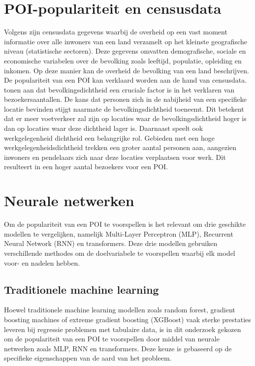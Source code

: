 \section{POI-populariteit en censusdata}

Volgens \textcite{Mrkic2020} zijn censusdata gegevens waarbij de overheid op een vast moment informatie over alle inwoners van een land verzamelt op het kleinste geografische niveau (statistische sectoren). Deze gegevens omvatten demografische, sociale en economische variabelen over de bevolking zoals leeftijd, populatie, opleiding en inkomen. Op deze manier kan de overheid de bevolking van een land beschrijven.
De populariteit van een POI kan verklaard worden aan de hand van censusdata. \textcite{Juhasz2020} tonen aan dat bevolkingsdichtheid een cruciale factor is in het verklaren van bezoekersaantallen. De kans dat personen zich in de nabijheid van een specifieke locatie bevinden stijgt naarmate de bevolkingsdichtheid toeneemt. Dit betekent dat er meer voetverkeer zal zijn op locaties waar de bevolkingsdichtheid hoger is dan op locaties waar deze dichtheid lager is. Daarnaast speelt ook werkgelegenheid dichtheid een belangrijke rol. Gebieden met een hoge werkgelegenheidsdichtheid trekken een groter aantal personen aan, aangezien inwoners en pendelaars zich naar deze locaties verplaatsen voor werk. Dit resulteert in een hoger aantal bezoekers voor een POI.

\section{Neurale netwerken}
Om de populariteit van een POI te voorspellen is het relevant om drie geschikte modellen te vergelijken, namelijk Multi-Layer Perceptron (MLP), Recurrent Neural Network (RNN) en transformers. Deze drie modellen gebruiken verschillende methodes om de doelvariabele te voorspellen waarbij elk model voor- en nadelen hebben.

\subsection{Traditionele machine learning}
Hoewel traditionele machine learning modellen zoals random forest, gradient boosting machines of extreme gradient boosting (XGBoost) vaak sterke prestaties leveren bij regressie problemen met tabulaire data, is in dit onderzoek gekozen om de populariteit van een POI te voorspellen door middel van neurale netwerken zoals MLP, RNN en transformers. Deze keuze is gebaseerd op de specifieke eigenschappen van de aard van het probleem.

